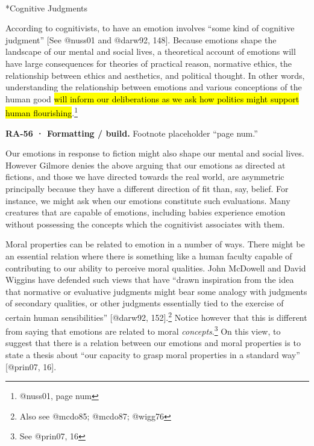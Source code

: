 \documentclass[
  letterpaper,
  DIV=11,
  numbers=noendperiod]{scrartcl}
\makeatletter
\let\oldparagraph\paragraph
\renewcommand{\paragraph}{
    \@ifstar
      \xxxParagraphStar
      \xxxParagraphNoStar
  }
\newcommand{\xxxParagraphStar}[1]{\oldparagraph*{#1}\mbox{}}
\newcommand{\xxxParagraphNoStar}[1]{\oldparagraph{#1}\mbox{}}
\theoremstyle{remark}
\makeatother
\begin{document}
\paragraph*{Cognitive Judgments}\label{cognitive-judgments}

According to cognitivists, to have an emotion involves ``some kind of
cognitive judgment'' {[}See @nuss01 and @darw92, 148{]}. Because
emotions shape the landscape of our mental and social lives, a
theoretical account of emotions will have large consequences for
theories of practical reason, normative ethics, the relationship between
ethics and aesthetics, and political thought. In other words,
understanding the relationship between emotions and various conceptions
of the human good \hl{will inform our deliberations as we ask how
politics might support human flourishing}.\footnote{@nuss01, page num}

\begin{tcolorbox}[enhanced jigsaw, arc=.35mm, bottomrule=.15mm, bottomtitle=1mm, breakable, colback=white, colbacktitle=quarto-callout-note-color!10!white, colframe=quarto-callout-note-color-frame, coltitle=black, left=2mm, leftrule=.75mm, opacityback=0, opacitybacktitle=0.6, rightrule=.15mm, title=\textcolor{quarto-callout-note-color}{\faInfo}\hspace{0.5em}{Note}, titlerule=0mm, toprule=.15mm, toptitle=1mm]

\textbf{RA-56 · Formatting / build.} Footnote placeholder ``page num.''

\end{tcolorbox}

Our emotions in response to fiction might also shape our mental and
social lives. However Gilmore denies the above arguing that our emotions
as directed at fictions, and those we have directed towards the real
world, are asymmetric principally because they have a different
direction of fit than, say, belief. For instance, we might ask when our
emotions constitute such evaluations. Many creatures that are capable of
emotions, including babies experience emotion without possessing the
concepts which the cognitivist associates with them.

Moral properties can be related to emotion in a number of ways. There
might be an essential relation where there is something like a human
faculty capable of contributing to our ability to perceive moral
qualities. John McDowell and David Wiggins have defended such views that
have ``drawn inspiration from the idea that normative or evaluative
judgments might bear some analogy with judgments of secondary qualities,
or other judgments essentially tied to the exercise of certain human
sensibilities'' {[}@darw92, 152{]}.\footnote{Also see @mcdo85; @mcdo87;
  @wigg76} Notice however that this is different from saying that
emotions are related to moral \emph{concepts}.\footnote{See @prin07, 16}
On this view, to suggest that there is a relation between our emotions
and moral properties is to state a thesis about ``our capacity to grasp
moral properties in a standard way'' {[}@prin07, 16{]}.
\end{document}
